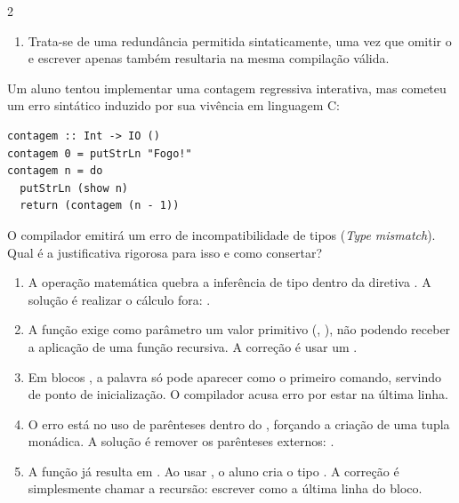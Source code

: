 \documentclass[a4paper,10pt,brazil]{article}
\begin{document}
\begin{multicols}{2}
\begin{enumerate}
  \item Trata-se de uma redundância permitida sintaticamente, uma vez que omitir o  e escrever apenas  também resultaria na mesma compilação válida.


\end{enumerate}

Um aluno tentou implementar uma contagem regressiva interativa, mas cometeu um erro sintático induzido por sua vivência em linguagem C:

\begin{verbatim}
contagem :: Int -> IO ()
contagem 0 = putStrLn "Fogo!"
contagem n = do
  putStrLn (show n)
  return (contagem (n - 1))
\end{verbatim}

O compilador emitirá um erro de incompatibilidade de tipos (\emph{Type mismatch}). Qual é a justificativa rigorosa para isso e como consertar?

\begin{enumerate}
  \item A operação matemática  quebra a inferência de tipo dentro da diretiva . A solução é realizar o cálculo fora: .
  \item A função  exige como parâmetro um valor primitivo (, ), não podendo receber a aplicação de uma função recursiva. A correção é usar um .

  \item Em blocos , a palavra  só pode aparecer como o primeiro comando, servindo de ponto de inicialização. O compilador acusa erro por estar na última linha.

  \item O erro está no uso de parênteses dentro do , forçando a criação de uma tupla monádica. A solução é remover os parênteses externos: .

  \item A função  já resulta em . Ao usar , o aluno cria o tipo . A correção é simplesmente chamar a recursão: escrever  como a última linha do bloco.



\end{enumerate}
\end{multicols}
\end{document}
